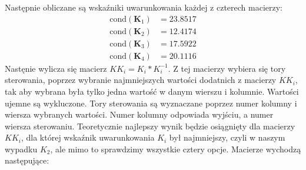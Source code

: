Następnie obliczane są wskaźniki uwarunkowania każdej z czterech macierzy:
\begin{align}
  \text{cond}(\bm{K}_1) &= \num{23.8517} \\
  \text{cond}(\bm{K}_2) &=  \num{12.4174} \\
  \text{cond}(\bm{K}_3) &= \num{17.5922} \\
  \text{cond}(\bm{K}_4) &= \num{20.1116}
\end{align}
Nastęnie wylicza się macierz $KK_i = K_i * K_i^{-1}$. Z tej macierzy
wybiera się tory sterowania, poprzez wybranie najmniejszych wartości dodatnich
z macierzy $KK_i$, tak aby wybrana była tylko jedna wartość w danym wierszu i kolumnie.
Wartości ujemne są wykluczone. Tory sterowania są wyznaczane poprzez numer kolumny
i wiersza wybranych wartości. Numer kolumny odpowiada wyjściu, a numer wiersza sterowaniu.
Teoretycznie najlepszy wynik będzie osiągnięty dla
macierzy $KK_i$, dla której wskaźnik uwarunkowania $K_i$ był najmniejszy, czyli
w naszym wypadku $K_2$, ale mimo to sprawdzimy wszystkie cztery opcje. Macierze
wychodzą następujące:



